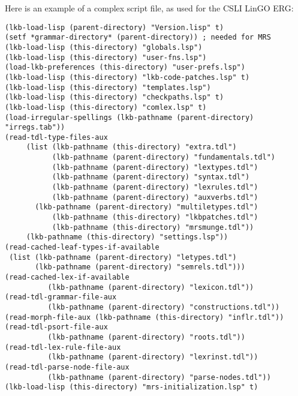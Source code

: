 \documentclass[12pt]{report}
\begin{document}
Here is an example of a complex script file, as used for
the CSLI LinGO ERG:
\begin{verbatim}
(lkb-load-lisp (parent-directory) "Version.lisp" t)
(setf *grammar-directory* (parent-directory)) ; needed for MRS
(lkb-load-lisp (this-directory) "globals.lsp")
(lkb-load-lisp (this-directory) "user-fns.lsp")
(load-lkb-preferences (this-directory) "user-prefs.lsp")
(lkb-load-lisp (this-directory) "lkb-code-patches.lsp" t)
(lkb-load-lisp (this-directory) "templates.lsp")
(lkb-load-lisp (this-directory) "checkpaths.lsp" t)
(lkb-load-lisp (this-directory) "comlex.lsp" t)
(load-irregular-spellings (lkb-pathname (parent-directory) "irregs.tab"))
(read-tdl-type-files-aux
     (list (lkb-pathname (this-directory) "extra.tdl")
           (lkb-pathname (parent-directory) "fundamentals.tdl")
           (lkb-pathname (parent-directory) "lextypes.tdl")
           (lkb-pathname (parent-directory) "syntax.tdl")
           (lkb-pathname (parent-directory) "lexrules.tdl")
           (lkb-pathname (parent-directory) "auxverbs.tdl")
	   (lkb-pathname (parent-directory) "multiletypes.tdl")	
           (lkb-pathname (this-directory) "lkbpatches.tdl")
           (lkb-pathname (this-directory) "mrsmunge.tdl"))
     (lkb-pathname (this-directory) "settings.lsp"))
(read-cached-leaf-types-if-available
 (list (lkb-pathname (parent-directory) "letypes.tdl")
       (lkb-pathname (parent-directory) "semrels.tdl")))
(read-cached-lex-if-available 
          (lkb-pathname (parent-directory) "lexicon.tdl"))
(read-tdl-grammar-file-aux 
          (lkb-pathname (parent-directory) "constructions.tdl"))
(read-morph-file-aux (lkb-pathname (this-directory) "inflr.tdl"))
(read-tdl-psort-file-aux 
          (lkb-pathname (parent-directory) "roots.tdl"))
(read-tdl-lex-rule-file-aux 
          (lkb-pathname (parent-directory) "lexrinst.tdl"))
(read-tdl-parse-node-file-aux 
          (lkb-pathname (parent-directory) "parse-nodes.tdl"))
(lkb-load-lisp (this-directory) "mrs-initialization.lsp" t)
\end{verbatim}
\end{document}
